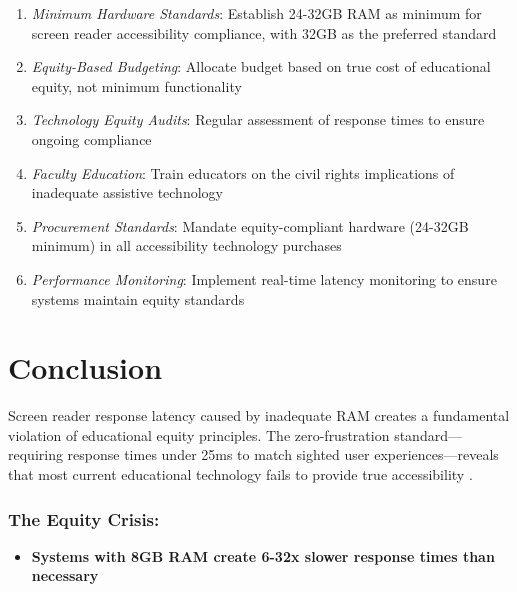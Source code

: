 \begin{enumerate}
	\item \emph{Minimum Hardware Standards}: Establish 24-32GB RAM as minimum for screen reader accessibility compliance, with 32GB as the preferred standard \supercite{EducationalEquityReport2024}
	\item \emph{Equity-Based Budgeting}: Allocate budget based on true cost of educational equity, not minimum functionality \supercite{EquityInFundingEducation}
	\item \emph{Technology Equity Audits}: Regular assessment of response times to ensure ongoing compliance \supercite{TechnologyAccessibilityAudits}
	\item \emph{Faculty Education}: Train educators on the civil rights implications of inadequate assistive technology \supercite{AccessibilityTrainingEducation}
	\item \emph{Procurement Standards}: Mandate equity-compliant hardware (24-32GB minimum) in all accessibility technology purchases \supercite{AccessibleProcurementGuidelines}
	\item \emph{Performance Monitoring}: Implement real-time latency monitoring to ensure systems maintain equity standards \supercite{SystemPerformanceMonitoring}
\end{enumerate}

\section{Conclusion}\label{chapter1-conclusion}

Screen reader response latency caused by inadequate RAM creates a fundamental violation of educational equity principles. The zero-frustration standard—requiring response times under 25ms to match sighted user experiences—reveals that most current educational technology fails to provide true accessibility \supercite{EducationalEquityReport2024, W3C2018WCAG21}.

\subsubsection{The Equity Crisis:}

\begin{itemize}
	\item \textbf{Systems with 8GB RAM create 6-32x slower response times than necessary} \supercite{EducationalEquityReport2024}
\end{itemize}
